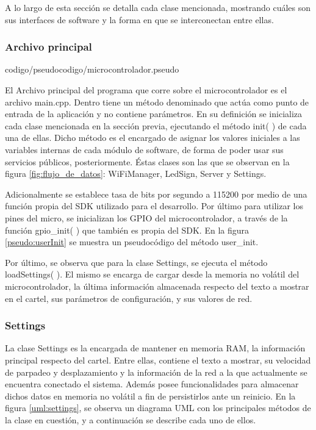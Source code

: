A lo largo de esta sección se detalla cada clase mencionada, mostrando cuáles son sus interfaces de software y la forma en que se interconectan entre ellas.

\subsubsection{Archivo principal} \label{sec:archivo_principal}

 {codigo/pseudocodigo/microcontrolador.pseudo}

El Archivo principal del programa que corre sobre el microcontrolador es el archivo main.cpp.
Dentro tiene un método denominado  que actúa como punto de entrada de la aplicación y no contiene parámetros.
En su definición se inicializa cada clase mencionada en la sección previa, ejecutando el método init( ) de cada una de ellas.
Dicho método es el encargado de asignar los valores iniciales a las variables internas de cada módulo de software, de forma de poder usar sus servicios públicos, posteriormente.
Éstas clases son las que se observan en la figura \ref{fig:flujo_de_datos}: WiFiManager, LedSign, Server y Settings.

Adicionalmente se establece tasa de bits por segundo a 115200 por medio de una función propia del SDK utilizado para el desarrollo.
Por último para utilizar los pines del micro, se inicializan los GPIO del microcontrolador, a través de la función gpio\_init( ) que también es propia del SDK.
En la figura \ref{pseudo:userInit} se muestra un pseudocódigo del método user\_init\( \).

Por último, se observa que para la clase Settings, se ejecuta el método loadSettings( ).
El mismo se encarga de cargar desde la memoria no volátil del microcontrolador, la última información almacenada respecto del texto a mostrar en el cartel, sus parámetros de configuración, y sus valores de red.


\subsubsection{Settings}

La clase Settings es la encargada de mantener en memoria RAM, la información principal respecto del cartel.
Entre ellas, contiene el texto a mostrar, su velocidad de parpadeo y desplazamiento y la información de la red a la que actualmente se encuentra conectado el sistema.
Además posee funcionalidades para almacenar dichos datos en memoria no volátil a fin de persistirlos ante un reinicio.
En la figura \ref{uml:settings}, se observa un diagrama UML con los principales métodos de la clase en cuestión, y a continuación se describe cada uno de ellos.

